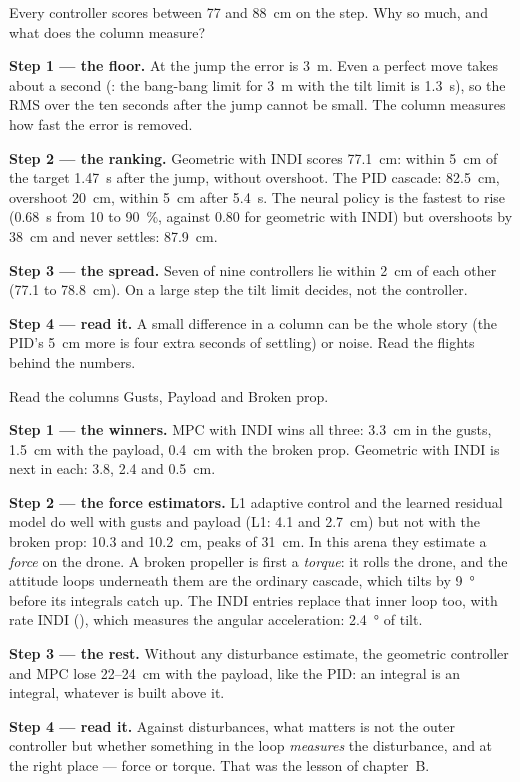 \begin{example}
\label{ex:arena-step}
Every controller scores between 77 and \SI{88}{cm} on the step. Why so much, and what does the column measure?

\textbf{Step 1 — the floor.} At the jump the error is \SI{3}{m}. Even a perfect move takes about a second (: the bang-bang limit for \SI{3}{m} with the tilt limit is \SI{1.3}{s}), so the RMS over the ten seconds after the jump cannot be small. The column measures how fast the error is removed.

\textbf{Step 2 — the ranking.} Geometric with INDI scores \SI{77.1}{cm}: within \SI{5}{cm} of the target \SI{1.47}{s} after the jump, without overshoot. The PID cascade: \SI{82.5}{cm}, overshoot \SI{20}{cm}, within \SI{5}{cm} after \SI{5.4}{s}. The neural policy is the fastest to rise (\SI{0.68}{s} from 10 to \SI{90}{\%}, against 0.80 for geometric with INDI) but overshoots by \SI{38}{cm} and never settles: \SI{87.9}{cm}.

\textbf{Step 3 — the spread.} Seven of nine controllers lie within \SI{2}{cm} of each other (77.1 to \SI{78.8}{cm}). On a large step the tilt limit decides, not the controller.

\textbf{Step 4 — read it.} A small difference in a column can be the whole story (the PID's \SI{5}{cm} more is four extra seconds of settling) or noise. Read the flights behind the numbers.
\end{example}

\begin{example}
\label{ex:arena-dist}
Read the columns Gusts, Payload and Broken prop.

\textbf{Step 1 — the winners.} MPC with INDI wins all three: \SI{3.3}{cm} in the gusts, \SI{1.5}{cm} with the payload, \SI{0.4}{cm} with the broken prop. Geometric with INDI is next in each: 3.8, 2.4 and \SI{0.5}{cm}.

\textbf{Step 2 — the force estimators.} L1 adaptive control and the learned residual model do well with gusts and payload (L1: 4.1 and \SI{2.7}{cm}) but not with the broken prop: 10.3 and \SI{10.2}{cm}, peaks of \SI{31}{cm}. In this arena they estimate a \emph{force} on the drone. A broken propeller is first a \emph{torque}: it rolls the drone, and the attitude loops underneath them are the ordinary cascade, which tilts by \SI{9}{\degree} before its integrals catch up. The INDI entries replace that inner loop too, with rate INDI (), which measures the angular acceleration: \SI{2.4}{\degree} of tilt.

\textbf{Step 3 — the rest.} Without any disturbance estimate, the geometric controller and MPC lose 22--\SI{24}{cm} with the payload, like the PID: an integral is an integral, whatever is built above it.

\textbf{Step 4 — read it.} Against disturbances, what matters is not the outer controller but whether something in the loop \emph{measures} the disturbance, and at the right place — force or torque. That was the lesson of chapter~B.
\end{example}

